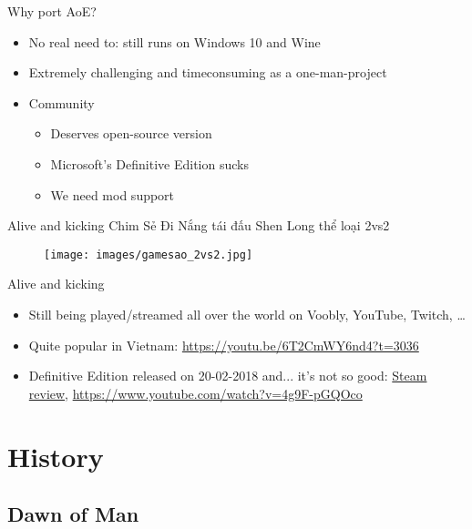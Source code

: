 \documentclass{beamer}
\begin{document}

\begin{frame}{Why port AoE?}
	\begin{itemize}
		\item No real need to: still runs on Windows 10 and Wine
		\item Extremely challenging and timeconsuming as a one-man-project
		\item Community
		\begin{itemize}
			\item Deserves open-source version
			\item Microsoft's Definitive Edition sucks
			\item We need mod support
		\end{itemize}
	\end{itemize}
\end{frame}


\begin{frame}{Alive and kicking}
	Chim Sẻ Đi Nắng tái đấu Shen Long thể loại 2vs2

	\begin{figure}
	\texttt{[image: images/gamesao\_2vs2.jpg]}
	\end{figure}

\end{frame}


\begin{frame}{Alive and kicking}
	\begin{itemize}
		\item Still being played/streamed all over the world on Voobly, YouTube, Twitch, \dots
		\item Quite popular in Vietnam: \url{https://youtu.be/6T2CmWY6nd4?t=3036}
		\item Definitive Edition released on 20-02-2018 and... it's not so good:
		\href{https://steamcommunity.com/id/youshallnothash/recommended/1017900/}{Steam review},
		\url{https://www.youtube.com/watch?v=4g9F-pGQOco}
	\end{itemize}

\end{frame}


\section{History}

\subsection{Dawn of Man}
\end{document}
